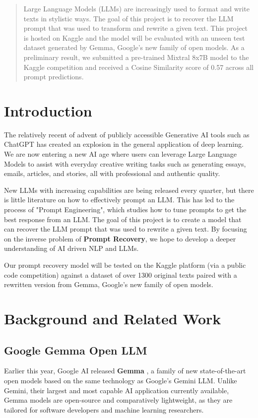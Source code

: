 \documentclass{article}
\theoremstyle{plain}
\theoremstyle{definition}
\theoremstyle{remark}
\begin{document}
\begin{abstract}
Large Language Models (LLMs) are increasingly used to format and write texts in stylistic ways. The goal of this project is to recover the LLM prompt that was used to transform and rewrite a given text. This project is hosted on Kaggle and the model will be evaluated with an unseen test dataset generated by Gemma, Google's new family of open models. As a preliminary result, we submitted a pre-trained Mixtral 8x7B model to the Kaggle competition and received a Cosine Similarity score of 0.57 across all prompt predictions.
\end{abstract}

\section{Introduction}
The relatively recent of advent of publicly accessible Generative AI tools such as ChatGPT \cite{chatgpt} has created an explosion in the general application of deep learning. We are now entering a new AI age where users can leverage Large Language Models to assist with everyday creative writing tasks such as generating essays, emails, articles, and stories, all with professional and authentic quality.

New LLMs with increasing capabilities are being released every quarter, but there is little literature on how to effectively prompt an LLM. This has led to the process of "Prompt Engineering", which studies how to tune prompts to get the best response from an LLM. The goal of this project is to create a model that can recover the LLM prompt that was used to rewrite a given text. By focusing on the inverse problem of \textbf{Prompt Recovery}, we hope to develop a deeper understanding of AI driven NLP and LLMs.   

Our prompt recovery model will be tested on the Kaggle platform (via a public code competition) against a dataset of over 1300 original texts paired with a rewritten version from Gemma, Google's new family of open models.

\section{Background and Related Work}
\subsection{Google Gemma Open LLM}
 Earlier this year, Google AI released \textbf{Gemma} \cite{geminiteam2023gemini}\cite{googlegemma}, a family of new state-of-the-art open models based on the same technology as Google's Gemini LLM. Unlike Gemini, their largest and most capable AI application currently available, Gemma models are open-source and comparatively lightweight, as they are tailored for software developers and machine learning researchers.
\end{document}
